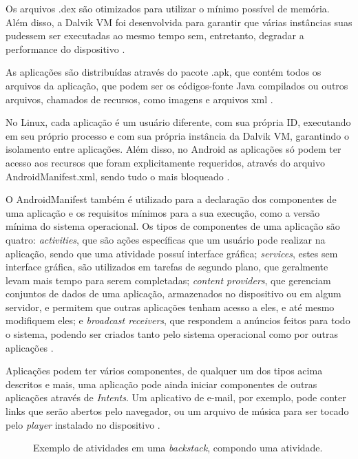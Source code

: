 \documentclass[diss]{template/setrem}
\begin{document}
Os arquivos .dex são otimizados para utilizar o mínimo possível de memória. Além disso, a Dalvik VM foi desenvolvida para garantir que várias instâncias suas pudessem ser executadas ao mesmo tempo sem, entretanto, degradar a performance do dispositivo \citep{Android2012}.

As aplicações são distribuídas através do pacote .apk, que contém todos os arquivos da aplicação, que podem ser os códigos-fonte Java compilados ou outros arquivos, chamados de recursos, como imagens e arquivos xml \citep{Android2012}.

No Linux, cada aplicação é um usuário diferente, com sua própria ID, executando em seu próprio processo e com sua própria instância da Dalvik VM, garantindo o isolamento entre aplicações. Além disso, no Android as aplicações só podem ter acesso aos recursos que foram explicitamente requeridos, através do arquivo AndroidManifest.xml, sendo tudo o mais bloqueado \citep{Android2012}.

O AndroidManifest também é utilizado para a declaração dos componentes de uma aplicação e os requisitos mínimos para a sua execução, como a versão mínima do sistema operacional. Os tipos de componentes de uma aplicação são quatro: \emph{activities}, que são ações específicas que um usuário pode realizar na aplicação, sendo que uma atividade possuí interface gráfica; \emph{services}, estes sem interface gráfica, são utilizados em tarefas de segundo plano, que geralmente levam mais tempo para serem completadas; \emph{content providers}, que gerenciam conjuntos de dados de uma aplicação, armazenados no dispositivo ou em algum servidor, e permitem que outras aplicações tenham acesso a eles, e até mesmo modifiquem eles; e \emph{broadcast receivers}, que respondem a anúncios feitos para todo o sistema, podendo ser criados tanto pelo sistema operacional como por outras aplicações \citep{Android2012}.

Aplicações podem ter vários componentes, de qualquer um dos tipos acima descritos e mais, uma aplicação pode ainda iniciar componentes de outras aplicações através de \emph{Intents}. Um aplicativo de e-mail, por exemplo, pode conter links que serão abertos pelo navegador, ou um arquivo de música para ser tocado pelo \emph{player} instalado no dispositivo \citep{Android2012}.

\begin{figure}[!h]
    \caption{Exemplo de atividades em uma \emph{backstack}, compondo uma atividade.}
    \label{fig:android-backstack}
\end{figure}
\end{document}
